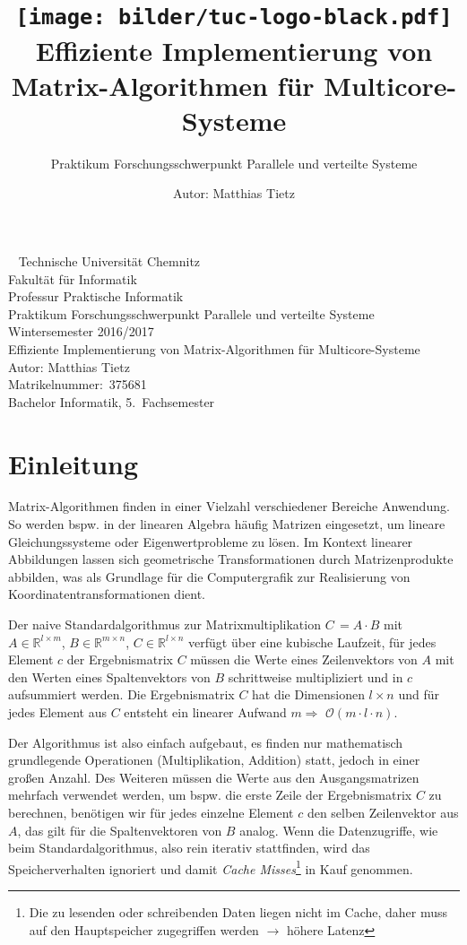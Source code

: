 \documentclass[a4paper,11pt]{scrartcl}
\title{\texttt{[image: bilder/tuc-logo-black.pdf]}
\\Effiziente Implementierung von Matrix-Algorithmen für Multicore-Systeme
}
\subtitle{Praktikum Forschungsschwerpunkt Parallele und verteilte Systeme}
\author{Autor: Matthias Tietz}
\newcommand{\bspw}{\mbox{bspw.}\xspace}
\begin{document}
\maketitle \thispagestyle{empty}

\newpage
\thispagestyle{empty}
~
\vfill
Technische Universität Chemnitz\\
Fakultät für Informatik\\
Professur Praktische Informatik\\
Praktikum Forschungsschwerpunkt Parallele und verteilte Systeme\\
Wintersemester 2016/2017\\

Effiziente Implementierung von Matrix-Algorithmen für Multicore-Systeme\\
Autor: Matthias Tietz\\
Matrikelnummer:~375681\\
Bachelor Informatik, 5.~Fachsemester

\newpage \tableofcontents
\newpage

\section{Einleitung}\label{chp:Einleitung}
Matrix-Algorithmen finden in einer Vielzahl verschiedener Bereiche Anwendung.
So werden \bspw in der linearen Algebra häufig Matrizen eingesetzt, um lineare Gleichungssysteme oder Eigenwertprobleme zu lösen. Im Kontext linearer Abbildungen lassen sich geometrische Transformationen
durch Matrizenprodukte abbilden, was als Grundlage für die Computergrafik zur Realisierung von Koordinatentransformationen dient.\newline

Der naive Standardalgorithmus zur Matrixmultiplikation 
$C\,= A \cdot B$ mit $A \in \mathbb{R}^{l \times m}$, $B \in \mathbb{R}^{m \times n}$,
$C \in \mathbb{R}^{l \times n}$ verfügt über eine kubische Laufzeit, für jedes Element $c$ der 
Ergebnismatrix $C$ müssen die Werte eines Zeilenvektors von $A$ mit den Werten eines Spaltenvektors
von $B$ schrittweise multipliziert und in $c$ aufsummiert werden. Die Ergebnismatrix $C$
hat die Dimensionen $l \times n$ und für jedes Element aus $C$ entsteht ein linearer Aufwand
$m \Rightarrow$ $\mathcal{O}(m \cdot l \cdot n)$.\newline

Der Algorithmus ist also einfach aufgebaut, es finden nur mathematisch grundlegende Operationen
(Multiplikation, Addition) statt, jedoch in einer großen Anzahl. 
Des Weiteren müssen die Werte aus den Ausgangsmatrizen mehrfach verwendet werden, um \bspw die erste Zeile der Ergebnismatrix $C$ zu berechnen,
benötigen wir für jedes einzelne Element $c$ den selben Zeilenvektor aus $A$, das gilt für die
Spaltenvektoren von $B$ analog.
Wenn die Datenzugriffe, wie beim Standardalgorithmus, also rein iterativ stattfinden,
wird das Speicherverhalten ignoriert und damit \emph{Cache Misses}\footnote{Die zu lesenden oder
schreibenden Daten liegen nicht im Cache, daher muss auf den Hauptspeicher zugegriffen werden
$\rightarrow$ höhere Latenz}
 in Kauf genommen. \newline
\end{document}
